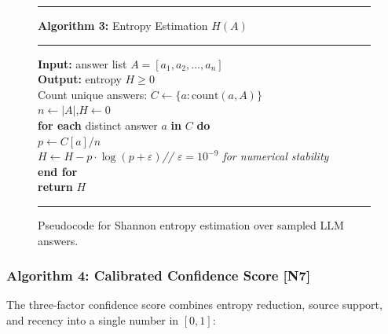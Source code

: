\begin{figure}[H]
\centering
\begin{minipage}{0.82\textwidth}
\hrule\vspace{4pt}
\textbf{Algorithm 3:} Entropy Estimation $H(A)$
\vspace{4pt}\hrule\vspace{6pt}
\textbf{Input:} answer list $A = [a_1, a_2, \ldots, a_n]$\\
\textbf{Output:} entropy $H \geq 0$\\[4pt]
Count unique answers: $C \leftarrow \{a : \text{count}(a, A)\}$\\
$n \leftarrow |A|$,\quad $H \leftarrow 0$\\
\textbf{for each} distinct answer $a$ \textbf{in} $C$ \textbf{do}\\
\hspace*{1.2em}$p \leftarrow C[a] / n$\\
\hspace*{1.2em}$H \leftarrow H - p \cdot \log(p + \varepsilon)$\hfill\textit{// $\varepsilon = 10^{-9}$ for numerical stability}\\
\textbf{end for}\\
\textbf{return} $H$
\vspace{6pt}\hrule
\end{minipage}
\caption{Pseudocode for Shannon entropy estimation over sampled LLM answers.}
\label{alg:entropy}
\end{figure}

\subsubsection{Algorithm 4: Calibrated Confidence Score [N7]}

The three-factor confidence score combines entropy reduction, source support, and recency into a single number in $[0,1]$:

